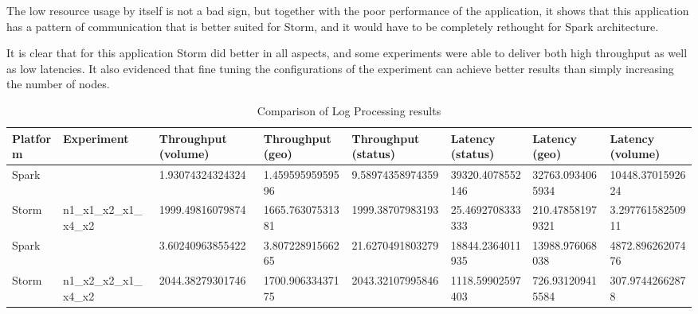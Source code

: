 \documentclass[ppgc,diss,english]{iiufrgs}
\begin{document}
The low resource usage by itself is not a bad sign, but together with the poor performance of the application, it shows that this application has a pattern of communication that is better suited for Storm, and it would have to be completely rethought for Spark architecture.

It is clear that for this application Storm did better in all aspects, and some experiments were able to deliver both high throughput as well as low latencies. It also evidenced that fine tuning the configurations of the experiment can achieve better results than simply increasing the number of nodes.

\begin{table}[H]
\tiny
\centering
\caption{Comparison of Log Processing results}
\label{table:log-processing-results}
\begin{tabular}{|l|l|l|l|l|l|l|l|}
\hline
Platform & Experiment                               & Throughput (volume)                      & Throughput (geo)                         & Throughput (status)                      & Latency (status)                         & Latency (geo)                            & Latency (volume)                         \\ \hline
Spark    &                                          & 1.93074324324324                         & 1.45959595959596                         & 9.58974358974359                         & 39320.4078552146                         & 32763.0934065934                         & 10448.3701592624                         \\ \cline{1-1} \cline{3-8} 
Storm    & \multirow{-2}{*}{n1\_x1\_x2\_x1\_x4\_x2} & \cellcolor[HTML]{67FD9A}1999.49816079874 & \cellcolor[HTML]{67FD9A}1665.76307531381 & \cellcolor[HTML]{67FD9A}1999.38707983193 & \cellcolor[HTML]{67FD9A}25.4692708333333 & \cellcolor[HTML]{67FD9A}210.478581979321 & \cellcolor[HTML]{67FD9A}3.29776158250911 \\ \hline
Spark    &                                          & 3.60240963855422                         & 3.80722891566265                         & 21.6270491803279                         & 18844.2364011935                         & 13988.976068038                          & 4872.89626207476                         \\ \cline{1-1} \cline{3-8} 
Storm    & \multirow{-2}{*}{n1\_x2\_x2\_x1\_x4\_x2} & \cellcolor[HTML]{67FD9A}2044.38279301746 & \cellcolor[HTML]{67FD9A}1700.90633437175 & \cellcolor[HTML]{67FD9A}2043.32107995846 & \cellcolor[HTML]{67FD9A}1118.59902597403 & \cellcolor[HTML]{67FD9A}726.931209415584 & \cellcolor[HTML]{67FD9A}307.97442662878  \\ \hline

\end{tabular}
\end{table}
\end{document}

